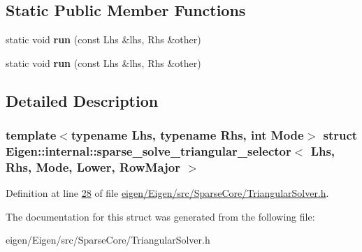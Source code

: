 \subsection*{Static Public Member Functions}
\begin{DoxyCompactItemize}
\item 
\mbox{\label{struct_eigen_1_1internal_1_1sparse__solve__triangular__selector_3_01_lhs_00_01_rhs_00_01_mode_00_01_lower_00_01_row_major_01_4_a5e7470d1164e3d4f3423fd019d23a235}} 
static void {\bfseries run} (const Lhs \&lhs, Rhs \&other)
\item 
\mbox{\label{struct_eigen_1_1internal_1_1sparse__solve__triangular__selector_3_01_lhs_00_01_rhs_00_01_mode_00_01_lower_00_01_row_major_01_4_a5e7470d1164e3d4f3423fd019d23a235}} 
static void {\bfseries run} (const Lhs \&lhs, Rhs \&other)
\end{DoxyCompactItemize}


\subsection{Detailed Description}
\subsubsection*{template$<$typename Lhs, typename Rhs, int Mode$>$\newline
struct Eigen\+::internal\+::sparse\+\_\+solve\+\_\+triangular\+\_\+selector$<$ Lhs, Rhs, Mode, Lower, Row\+Major $>$}



Definition at line \hyperlink{eigen_2_eigen_2src_2_sparse_core_2_triangular_solver_8h_source_l00028}{28} of file \hyperlink{eigen_2_eigen_2src_2_sparse_core_2_triangular_solver_8h_source}{eigen/\+Eigen/src/\+Sparse\+Core/\+Triangular\+Solver.\+h}.



The documentation for this struct was generated from the following file\+:\begin{DoxyCompactItemize}
\item 
eigen/\+Eigen/src/\+Sparse\+Core/\+Triangular\+Solver.\+h\end{DoxyCompactItemize}
